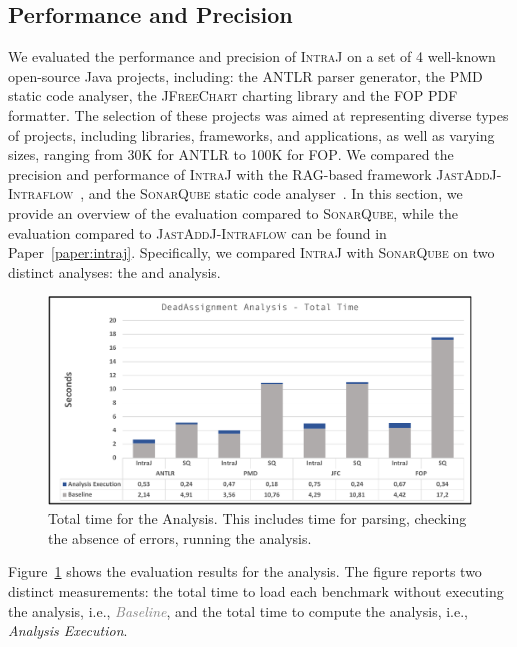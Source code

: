 \subsection{Performance and Precision}
\label{sec:performanceandprecision}
We evaluated the performance and precision of \textsc{IntraJ} on a set of 4 well-known
open-source Java projects, including: the \textsc{ANTLR} parser generator, the \textsc{PMD} static code analyser,
the \textsc{JFreeChart} charting library and the \textsc{FOP} PDF formatter.
The selection of these projects was aimed at representing diverse types of projects, 
including libraries, frameworks, and applications, as well as varying sizes, 
ranging from 30K for \textsc{ANTLR} to 100K for \textsc{FOP}.
 We compared the precision and performance of 
\textsc{IntraJ} with the RAG-based framework \textsc{JastAddJ-Intraflow}~\cite{10.1016/j.scico.2012.02.002}, 
and the \textsc{SonarQube} static code analyser~\cite{sonarqube}. 
In this section, we provide an overview of the evaluation compared to 
\textsc{SonarQube}, while the evaluation compared to \textsc{JastAddJ-Intraflow} 
can be found in Paper~\ref{paper:intraj}. Specifically, we compared \textsc{IntraJ} 
with \textsc{SonarQube} on two distinct analyses: the  
and  analysis.

\begin{figure}[H]
  \includegraphics[width=1\linewidth]{kappa/img/DAATotalTime.pdf}
  \caption{\label{fig:DAATotalTime}Total time for the  Analysis. This includes time for parsing,
  checking the absence of errors, running the analysis.}
\end{figure}


Figure~\ref{fig:DAATotalTime} shows the evaluation results for the  analysis. 
The figure reports two distinct measurements: the total time to load each benchmark without 
executing the analysis, i.e.,  \textcolor{grey}{\emph{Baseline}}, and the total 
time to compute the analysis, i.e., \textcolor{NavyBlue}{\emph{Analysis Execution}}.

